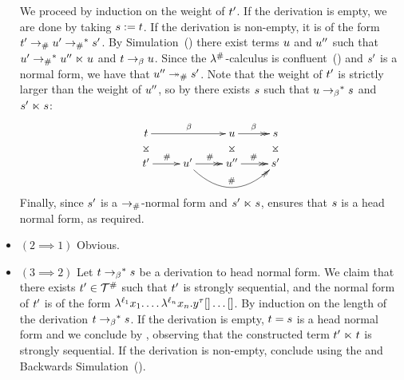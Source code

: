 \begin{itemize}
  We proceed by induction on the weight of $t'$.
  If the derivation is empty, we are done by taking $s := t$.
  If the derivation is non-empty, it is of the form $t' \mathrel{\to_{\mathtt{\#}}} u' \mathrel{\to_{\mathtt{\#}}}^* s'$.
  By Simulation~() there exist terms $u$ and $u''$
  such that $u' \mathrel{\to_{\mathtt{\#}}}^* u'' \mathrel{\ltimes} u$
  and $t \mathrel{\to_\beta} u$. Since the $\lambda^{\mathtt{\#}}$-calculus is
  confluent~() and $s'$ is a normal form,
  we have that $u'' \mathrel{\twoheadrightarrow_{\mathtt{\#}}} s'$.
  Note that the weight of $t'$ is strictly larger than the weight of $u''$,
  so by \ih there exists $s$ such that $u \mathrel{\to_\beta}^* s$
  and $s' \mathrel{\ltimes} s$:
  \[
    \xymatrix@R=.5cm{
      \tm
        \ar@{}[d]|*=0[@]{\rtimes} 
        \ar[rr]^{\beta}
    &
    &
      \tmthree
        \ar@{}[d]|*=0[@]{\rtimes} 
        \ar@{->>}[r]^{\beta}
    &
      \tmtwo
        \ar@{}[d]|*=0[@]{\rtimes} 
    \\
      \tm'
        \ar[r]^{\dist}
    &
      \tmthree'
        \ar@{->>}[r]^{\dist}
        \ar@/_.75cm/@{->>}[rr]^{\dist}
    &
      \tmthree''
        \ar@{->>}[r]^{\dist}
    &
      \tmtwo'
    }
  \]
  Finally, since $s'$ is a $\mathrel{\to_{\mathtt{\#}}}$-normal form and $s' \mathrel{\ltimes} s$,
  ensures that $s$ is a head normal form, as required.
\item $(2 \implies 1)$ Obvious.
\item $(3 \implies 2)$
  Let $t \mathrel{\to_\beta}^* s$ be a derivation to head normal form.
  We claim that there exists $t' \in \mathcal{T}^{\mathtt{\#}}$ such that $t'$ is strongly sequential,
  and the normal form of $t'$ is of the form $\lambda^{\ell_1} x_1. \hdots\lambda^{\ell_n} x_n. y^\tau[]\hdots[]$.
  By induction on the length of the derivation $t \mathrel{\to_\beta}^* s$.
  If the derivation is empty, $t = s$ is a head normal form
  and we conclude by , observing that the constructed term $t' \mathrel{\ltimes} t$
  is strongly sequential.
  If the derivation is non-empty, conclude using the \ih and Backwards Simulation~().
\end{itemize}
